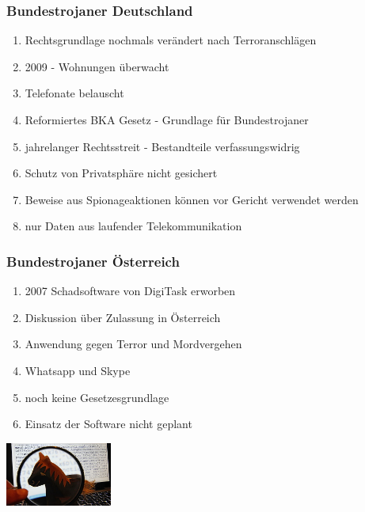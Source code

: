 \documentclass{beamer}
\begin{document}
\begin{frame}
	\frametitle{Bundestrojaner Deutschland}
	\begin{enumerate}
		\item Rechtsgrundlage nochmals verändert nach Terroranschlägen
		\item 2009 - Wohnungen überwacht
		\item Telefonate belauscht
		\item Reformiertes BKA Gesetz - Grundlage für Bundestrojaner
		\item jahrelanger Rechtsstreit - Bestandteile verfassungswidrig
		\item Schutz von Privatsphäre nicht gesichert
		\item Beweise aus Spionageaktionen können vor Gericht verwendet werden
		\item nur Daten aus laufender Telekommunikation
	\end{enumerate}
\end{frame}


\begin{frame}
	\frametitle{Bundestrojaner Österreich}
		\begin{enumerate}
		\item 2007 Schadsoftware von DigiTask erworben
		\item Diskussion über Zulassung in Österreich
		\item Anwendung gegen Terror und Mordvergehen
		\item Whatsapp und Skype 
		\item noch keine Gesetzesgrundlage 
		\item Einsatz der Software nicht geplant
		\end{enumerate}
		\flushright
	\includegraphics[width= 3.5cm]{bilder/oesterreich.jpg}
\end{frame}
\end{document}

